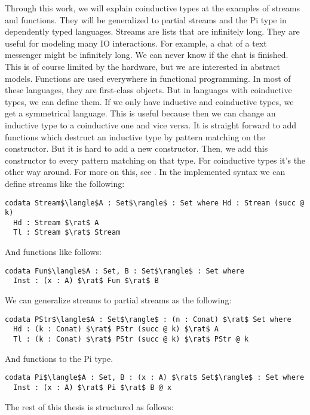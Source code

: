 \documentclass[a4paper,cleardoubleempty,BCOR1cm]{scrbook}
\begin{document}
Through this work, we will explain coinductive types at the examples of streams
and functions. They will be generalized to partial streams and the Pi type in
dependently typed languages. Streams are lists that are infinitely long. They
are useful for modeling many IO interactions. For example, a chat of a text
messenger might be infinitely long. We can never know if the chat is finished.
This is of course limited by the hardware, but we are interested in abstract
models. Functions are used everywhere in functional programming. In most of
these languages, they are first-class objects. But in languages with
coinductive types, we can define them. If we only have inductive and
coinductive types, we get a symmetrical language. This is useful because
then we can change an inductive type to a coinductive one and vice versa. It
is straight forward to add functions which destruct an inductive type by
pattern matching on the constructor. But it is hard to add a new constructor.
Then, we add this constructor to every pattern matching on that type.
For coinductive types it's the other way around. For more on this, see
\cite{binder2019decomposition}. In the implemented syntax we can define streams
like the following:
\begin{lstlisting}
codata Stream$\langle$A : Set$\rangle$ : Set where Hd : Stream (succ @ k)
  Hd : Stream $\rat$ A
  Tl : Stream $\rat$ Stream
\end{lstlisting}
And functions like follows:
\begin{lstlisting}
codata Fun$\langle$A : Set, B : Set$\rangle$ : Set where
  Inst : (x : A) $\rat$ Fun $\rat$ B
\end{lstlisting}
We can generalize streams to partial streams as the following:
\begin{lstlisting}
codata PStr$\langle$A : Set$\rangle$ : (n : Conat) $\rat$ Set where
  Hd : (k : Conat) $\rat$ PStr (succ @ k) $\rat$ A
  Tl : (k : Conat) $\rat$ PStr (succ @ k) $\rat$ PStr @ k
\end{lstlisting}
And functions to the Pi type.
\begin{lstlisting}
codata Pi$\langle$A : Set, B : (x : A) $\rat$ Set$\rangle$ : Set where
  Inst : (x : A) $\rat$ Pi $\rat$ B @ x
\end{lstlisting}

The rest of this thesis is structured as follows:
\end{document}

